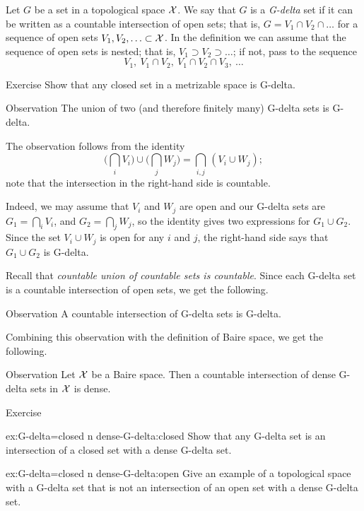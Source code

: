 Let $G$ be a set in a topological space $\mathcal{X}$.
We say that $G$ is a \emph{G-delta} set if it can be written as a countable intersection of open sets;
that is, $G=V_1\cap V_2\cap\ldots$ for a sequence of open sets $V_1,V_2,\ldots \subset \mathcal{X}$.
In the definition we can assume that the sequence of open sets is nested;
that is, $V_1\supset V_2\supset\ldots$;
if not, pass to the sequence
\[V_1,\ V_1\cap V_2,\ V_1\cap V_2\cap V_3,\ \ldots\]

\begin{thm}{Exercise}\label{ex:closed-G-delta}
Show that any closed set in a metrizable space is G-delta.
\end{thm}


\begin{thm}{Observation}\label{obs:uG-delta}
The union of two (and therefore finitely many) G-delta sets is G-delta.
\end{thm}

The observation follows from the identity
\[\biggl(\bigcap_i V_i\biggr)\cup \biggl(\bigcap_j W_j\biggr)
=
\bigcap_{i,j}\, (V_i\cup W_j);\]
note that the intersection in the right-hand side is countable.

Indeed, we may assume that $V_i$ and $W_j$ are open and our G-delta sets are $G_1=\bigcap_i V_i$, and $G_2=\bigcap_j W_j$, so the identity gives two expressions for $G_1\cup G_2$.
Since the set $V_i\cup W_j$ is open for any $i$ and $j$, the right-hand side says that $G_1\cup G_2$ is G-delta.
\qeds


Recall that \textit{countable union of countable sets is countable}.
Since each G-delta set is a countable intersection of open sets,
we get the following.

\begin{thm}{Observation}\label{obs:nG-delta}
A countable intersection of G-delta sets is G-delta.
\end{thm}

Combining this observation with the definition of Baire space, we get the following.

\begin{thm}{Observation}\label{obs:G-delta}
Let $\mathcal{X}$ be a Baire space.
Then a countable intersection of dense G-delta sets in $\mathcal{X}$ is dense.
\end{thm}

\begin{thm}{Exercise}\label{ex:G-delta=closed n dense-G-delta}
\begin{subthm}{ex:G-delta=closed n dense-G-delta:closed}
Show that any G-delta set is an intersection of a closed set with a dense G-delta set.
\end{subthm}

\begin{subthm}{ex:G-delta=closed n dense-G-delta:open}
Give an example of a topological space with a G-delta set that is not an intersection of an open set with a dense G-delta set.
\end{subthm}

\end{thm}

